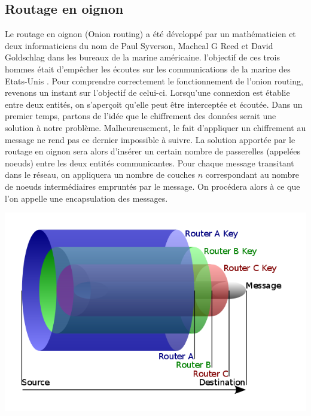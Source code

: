 \documentclass[letterpaper]{article}
\begin{document}
\subsection{Routage en oignon}
Le routage en oignon (Onion routing) a été développé par un mathématicien et deux informaticiens du nom de Paul Syverson, Macheal G Reed et David Goldschlag dans les bureaux de la marine américaine. l'objectif de ces trois hommes était d'empêcher les écoutes sur les communications de la marine des Etats-Unis \cite{ref11}. Pour comprendre correctement le fonctionnement de l'onion routing, revenons un instant sur l'objectif de celui-ci. Lorsqu'une connexion est établie entre deux entités, on s'aperçoit qu'elle peut être interceptée et écoutée. Dans un premier temps, partons de l'idée que le chiffrement des données serait une solution à notre problème. Malheureusement, le fait d'appliquer un chiffrement au message ne rend pas ce dernier impossible à suivre. La solution apportée par le routage en oignon sera alors d'insérer un certain nombre de passerelles (appelées noeuds) entre les deux entités communicantes. Pour chaque message transitant dans le réseau, on appliquera un nombre de couches $n$ correspondant au nombre de noeuds intermédiaires empruntés par le message. On procédera alors à ce que l'on appelle une encapsulation des messages.
\begin{center}
\includegraphics[scale=0.3]{imageOnionRouting.png}
\end{center}
\end{document}
